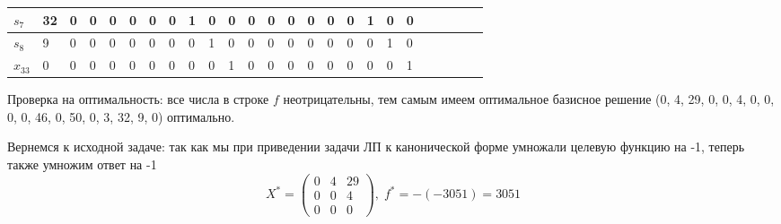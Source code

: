 \documentclass[a4paper]{article}
\theoremstyle{definition}
\theoremstyle{remark}
\begin{document}
\begin{table}[h]
\begin{tabular}{|l|l|l|l|l|l|l|l|l|l|l|l|l|l|l|l|l|l|l|l|l|l|l|l|l|}
		$s_7$    & 32    & 0        & 0        & 0        & 0        & 0        & 0        & 1        & 0        & 0        & 0     & 0     & 0     & 0     & 0     & 0     & 1     & 0     & 0     \\ \hline
		$s_8$    & 9     & 0        & 0        & 0        & 0        & 0        & 0        & 0        & 1        & 0        & 0     & 0     & 0     & 0     & 0     & 0     & 0     & 1     & 0     \\ \hline
		$x_{33}$ & 0     & 0        & 0        & 0        & 0        & 0        & 0        & 0        & 0        & 1        & 0     & 0     & 0     & 0     & 0     & 0     & 0     & 0     & 1     \\ \hline
	\end{tabular}
\end{table}

Проверка на оптимальность: все числа в строке $f$ неотрицательны, тем самым имеем оптимальное базисное решение (0, 4, 29, 0, 0, 4, 0, 0, 0, 0, 46, 0, 50, 0, 3, 32, 9, 0) оптимально.

Вернемся к исходной задаче: так как мы при приведении задачи ЛП к канонической форме
умножали целевую функцию на -1, теперь также умножим ответ на -1
\[X^* = \begin{pmatrix}
		0 & 4 & 29 \\ 0 & 0 & 4 \\ 0 & 0 & 0
	\end{pmatrix},\; f^* = -(-3051) =  3051\]
\end{document}
